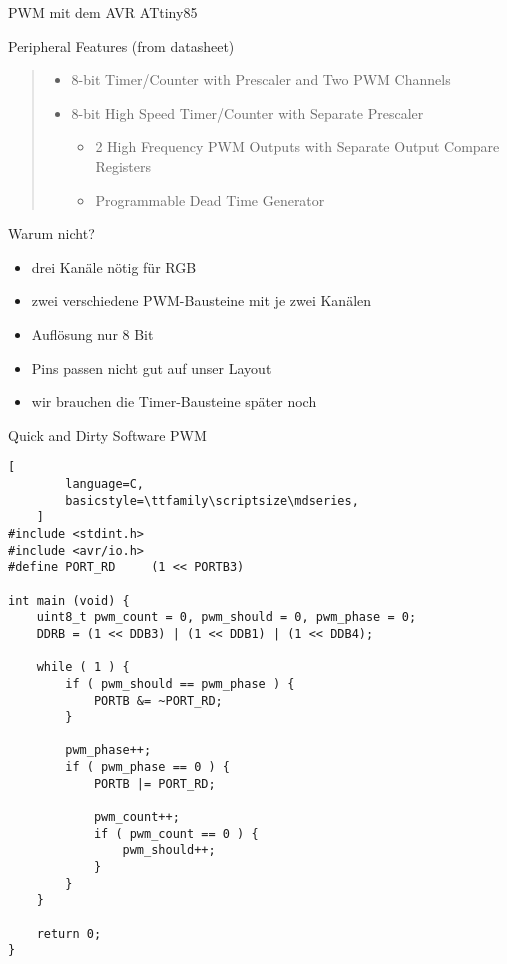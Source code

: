 \documentclass{beamer}
\begin{document}
\begin{frame}{PWM mit dem AVR ATtiny85}
    \begin{block}{Peripheral Features (from datasheet)}
        \begin{quote}
            \begin{itemize}
                \item 8-bit Timer/Counter with Prescaler and Two PWM Channels
                \item 8-bit High Speed Timer/Counter with Separate Prescaler
                    \begin{itemize}
                        \item 2 High Frequency PWM Outputs with Separate Output Compare Registers
                        \item Programmable Dead Time Generator
                    \end{itemize}
            \end{itemize}
        \end{quote}
    \end{block}
    \pause
    \begin{block}{Warum nicht?}
        \begin{itemize}
            \item drei Kanäle nötig für RGB
            \item zwei verschiedene PWM-Bausteine mit je zwei Kanälen
            \item Auflösung nur 8 Bit
            \item Pins passen nicht gut auf unser Layout
            \item wir brauchen die Timer-Bausteine später noch
        \end{itemize}
    \end{block}
\end{frame}

\begin{frame}[fragile]{Quick and Dirty Software PWM}
    \begin{lstlisting}[
        language=C,
        basicstyle=\ttfamily\scriptsize\mdseries,
    ]
#include <stdint.h>
#include <avr/io.h>
#define PORT_RD     (1 << PORTB3)

int main (void) {
    uint8_t pwm_count = 0, pwm_should = 0, pwm_phase = 0;
    DDRB = (1 << DDB3) | (1 << DDB1) | (1 << DDB4);

    while ( 1 ) {
        if ( pwm_should == pwm_phase ) {
            PORTB &= ~PORT_RD;
        }

        pwm_phase++;
        if ( pwm_phase == 0 ) {
            PORTB |= PORT_RD;

            pwm_count++;
            if ( pwm_count == 0 ) {
                pwm_should++;
            }
        }
    }

    return 0;
}
    \end{lstlisting}
\end{frame}
\end{document}
